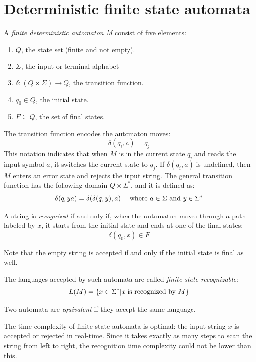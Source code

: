 \section{Deterministic finite state automata}

\begin{definition}
    A \emph{finite deterministic automaton M} consist of five elements:
    \begin{enumerate}
        \item $Q$, the state set (finite and not empty). 
        \item $\Sigma$, the input or terminal alphabet
        \item $\delta:(Q \times \Sigma) \rightarrow Q$, the transition function.
        \item $q_0 \in Q$, the initial state. 
        \item $F\subseteq Q$, the set of final states.
    \end{enumerate}
\end{definition}

The transition function encodes the automaton moves: 
\[\delta(q_i,a)=q_j\]
This notation indicates that when $M$ is in the current state $q_i$ and reads the input symbol $a$, it switches the current state to $q_j$. 
If $\delta(q_i,a)$ is undefined, then $M$ enters an error state and rejects the input string. 
The general transition function has the following domain $Q \times \Sigma^{*}$, and it is defined as:
\[\delta(q,ya)=\delta(\delta(q,y),a) \:\:\:\:\:\: \textnormal{where } a \in \Sigma \textnormal{ and }y \in \Sigma^{*}\]

\begin{definition}
    A string is \emph{recognized} if and only if, when the automaton moves through a path labeled by $x$, it starts from the initial state and ends at one of the final states: 
    \[\delta(q_0,x) \in F\]
\end{definition}
Note that the empty string is accepted if and only if the initial state is final as well. 
\begin{definition}
    The languages accepted by such automata are called \emph{finite-state recognizable}: 
    \[L(M)=\{x \in \Sigma^{*}|x \textnormal{ is recognized by } M\}\]
    
    Two automata are \emph{equivalent} if they accept the same language.
\end{definition}
The time complexity of finite state automata is optimal: the input string $x$ is accepted or rejected in real-time. 
Since it takes exactly as many steps to scan the string from left to right, the recognition time complexity could not be lower than this.

